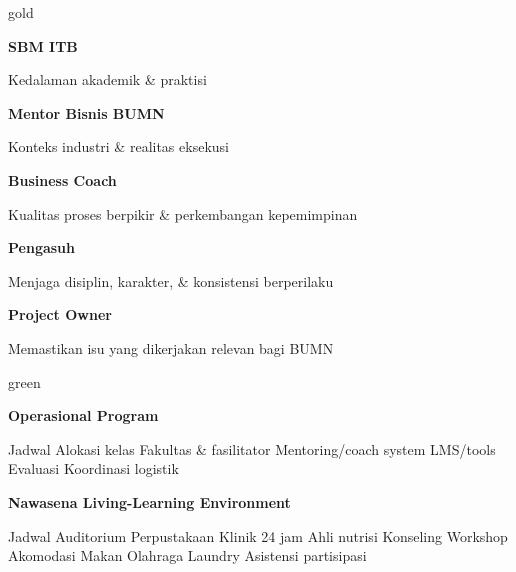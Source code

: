 \begin{infobox}{gold}
\begin{tcbraster}[raster columns=5,raster equal height=rows,raster column skip=2mm]
\begin{tcolorbox}[colback=palegold,colframe=palegold,boxrule=0pt]\textbf{SBM ITB}\par Kedalaman akademik \& praktisi\end{tcolorbox}
\begin{tcolorbox}[colback=palegold,colframe=palegold,boxrule=0pt]\textbf{Mentor Bisnis BUMN}\par Konteks industri \& realitas eksekusi\end{tcolorbox}
\begin{tcolorbox}[colback=palegold,colframe=palegold,boxrule=0pt]\textbf{Business Coach}\par Kualitas proses berpikir \& perkembangan kepemimpinan\end{tcolorbox}
\begin{tcolorbox}[colback=palegold,colframe=palegold,boxrule=0pt]\textbf{Pengasuh}\par Menjaga disiplin, karakter, \& konsistensi berperilaku\end{tcolorbox}
\begin{tcolorbox}[colback=palegold,colframe=palegold,boxrule=0pt]\textbf{Project Owner}\par Memastikan isu yang dikerjakan relevan bagi BUMN\end{tcolorbox}
\end{tcbraster}
\end{infobox}

\begin{infobox}{green}
\begin{tcbraster}[raster columns=2,raster equal height=rows,raster column skip=2mm]
\begin{tcolorbox}[colback=palegreen,colframe=palegreen,boxrule=0pt]
\textbf{Operasional Program}\par Jadwal \textbullet{} Alokasi kelas \textbullet{} Fakultas \& fasilitator \textbullet{} Mentoring/coach system \textbullet{} LMS/tools \textbullet{} Evaluasi \textbullet{} Koordinasi logistik
\end{tcolorbox}
\begin{tcolorbox}[colback=palegreen,colframe=palegreen,boxrule=0pt]
\textbf{Nawasena Living-Learning Environment}\par Jadwal \textbullet{} Auditorium \textbullet{} Perpustakaan \textbullet{} Klinik 24 jam \textbullet{} Ahli nutrisi \textbullet{} Konseling \textbullet{} Workshop \textbullet{} Akomodasi \textbullet{} Makan \textbullet{} Olahraga \textbullet{} Laundry \textbullet{} Asistensi partisipasi
\end{tcolorbox}
\end{tcbraster}
\end{infobox}

